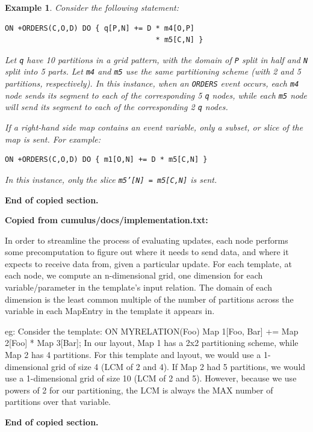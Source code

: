 \documentclass{sig-semester}
\newtheorem{example}[theorem]{Example}
\begin{document}
\begin{example}
Consider the following statement:
\begin{verbatim}
ON +ORDERS(C,O,D) DO { q[P,N] += D * m4[O,P] 
                                   * m5[C,N] }
\end{verbatim}

Let \texttt{q} have 10 partitions in a grid pattern, with the domain of \texttt{P} split in half and \texttt{N} split into 5 parts.  Let \texttt{m4} and \texttt{m5} use the same partitioning scheme (with 2 and 5 partitions, respectively).  In this instance, when an \texttt{ORDERS} event occurs, each \texttt{m4} node sends its segment to each of the corresponding 5 \texttt{q} nodes, while each \texttt{m5} node will send its segment to each of the corresponding 2 \texttt{q} nodes. 

If a right-hand side map contains an event variable, only a subset, or slice of the map is sent.  For example:
\begin{verbatim}
ON +ORDERS(C,O,D) DO { m1[O,N] += D * m5[C,N] }
\end{verbatim}
In this instance, only the slice \texttt{m5'[N] = m5[C,N]} is sent.
\end{example}

\textbf{End of copied section.}

\textbf{Copied from cumulus/docs/implementation.txt:}

In order to streamline the process of evaluating updates, each node performs some precomputation to figure out where it needs to send data, and where it expects to receive data from, given a particular update.  For each template, at each node, we compute an n-dimensional grid, one dimension for each variable/parameter in the template's input relation.  The domain of each dimension is the least common multiple of the number of partitions across the variable in each MapEntry in the template it appears in.

  eg: Consider the template: ON MYRELATION(Foo) Map 1[Foo, Bar] += Map 2[Foo] * Map 3[Bar];
  In our layout, Map 1 has a 2x2 partitioning scheme, while Map 2 has 4 partitions.  For this template and 
  layout, we would use a 1-dimensional grid of size 4 (LCM of 2 and 4).  If Map 2 had 5 partitions, we would 
  use a 1-dimensional grid of size 10 (LCM of 2 and 5).  However, because we use powers of 2 for our 
  partitioning, the LCM is always the MAX number of partitions over that variable.

\textbf{End of copied section. }
\end{document}
